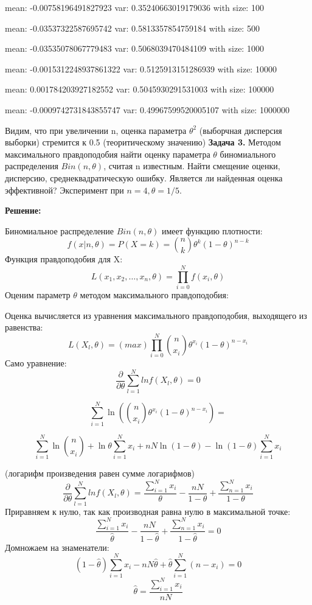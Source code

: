 \documentclass{article}
\begin{document}
mean:  -0.00758196491827923 var:  0.35240663019179036 with size:  100

mean:  -0.03537322587695742 var:  0.5813357854759184 with size:  500

mean:  -0.03535078067779483 var:  0.5068039470484109 with size:  1000

mean:  -0.0015312248937861322 var:  0.5125913151286939 with size:  10000

mean:  0.001784203927182552 var:  0.5045930291531003 with size:  100000

mean:  -0.0009742731843855747 var:  0.49967599520005107 with size:  1000000
\vspace{5mm}

Видим, что при увеличении n, оценка параметра $\theta^2$ (выборчная дисперсия выборки) стремится к 0.5 (теоритическому значению)
\newpage
\textbf{Задача 3.} Методом максимального правдоподобия найти оценку параметра $\theta$ биномиального распределения $Bin(n,\theta)$, считая n известным. Найти смещение оценки, дисперсию, среднеквадратическую ошибку. Является ли найденная оценка эффективной? Эксперимент при $n = 4, \theta= 1/5$.
\vspace{5mm}

\textbf{Решение:}

Биномиальное распределение  $Bin(n, \theta)$ имеет функцию плотности: $$f(x | n,\theta) = P(X = k) = \binom{n}{k} \theta^{k} (1-\theta)^{n - k}$$
Функция правдоподобия для X: $$L(x_1, x_2, \ldots ,x_n, \theta) = \prod_{i=0}^N f(x_i, \theta)$$
Оценим параметр $\theta$ методом максимального правдоподобия:

Оценка вычисляется из уравнения максимального правдоподобия, выходящего из равенства:
$$ L(X_l, \theta) = (max) \prod_{i=0}^N \binom{n}{x_i} \theta^{x_i}(1-\theta)^{n-x_i} $$
Само уравнение:
$$ \frac{\partial}{\partial \theta} \sum_{l=1}^{N}ln f(X_l, \theta) = 0$$

$$ \sum_{i=1}^N \ln (\binom{n}{x_i} \theta^{x_i}(1-\theta)^{n-x_i}) =$$

$$\sum_{i=1}^N \ln \binom{n}{x_i} + \ln\theta\sum_{i=1}^N x_i  + nN\ln(1-\theta) - \ln(1-\theta)\sum_{i=1}^N x_i $$

(логарифм произведения равен сумме логарифмов)
$$\frac{\partial}{\partial \theta} \sum\limits_{l=1}^{N}ln f(X_l, \theta) = \frac{\sum_{i=1}^{N} x_i}{\theta} - \frac{nN}{1-\theta} + \frac{\sum_{n=1}^{N}x_i}{1-\theta}$$
Приравняем к нулю, так как производная равна нулю в максимальной точке:
$$\frac{\sum_{i=1}^{N} x_i}{\hat \theta} - \frac{nN}{1-\hat \theta} + \frac{\sum_{n=1}^{N}x_i}{1-\hat \theta} = 0$$
Домножаем на знаменатели:
$$(1-\hat{\theta}) \sum_{i=1}^N x_i - nN\hat{\theta} + \hat{\theta}\sum_{i=1}^N(n-x_i) = 0$$
$$\hat \theta = \frac{\sum\limits_{i=1}^N x_i}{nN}$$
\vspace{5mm}
\end{document}
